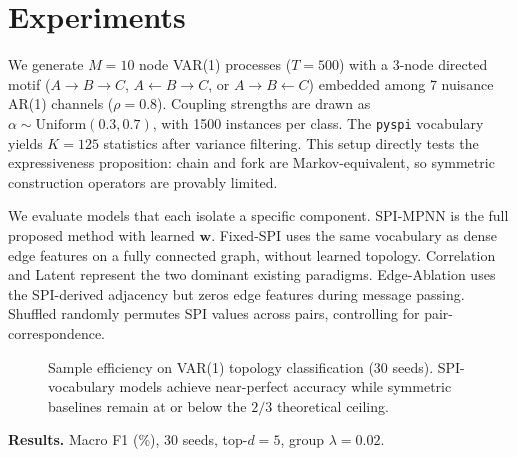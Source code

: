 \documentclass{article}
\theoremstyle{plain}
\begin{document}
\section{Experiments}
\label{sec:experiments}

We generate $M{=}10$ node VAR(1) processes ($T{=}500$) with a 3-node directed motif ($A{\to}B{\to}C$, $A{\leftarrow}B{\to}C$, or $A{\to}B{\leftarrow}C$) embedded among 7 nuisance AR(1) channels ($\rho{=}0.8$). Coupling strengths are drawn as $\alpha \sim \mathrm{Uniform}(0.3, 0.7)$, with 1500 instances per class. The \texttt{pyspi} vocabulary yields $K{=}125$ statistics after variance filtering. This setup directly tests the expressiveness proposition: chain and fork are Markov-equivalent, so symmetric construction operators are provably limited.

We evaluate models that each isolate a specific component. SPI-MPNN is the full proposed method with learned $\mathbf{w}$. Fixed-SPI uses the same vocabulary as dense edge features on a fully connected graph, without learned topology. Correlation and Latent represent the two dominant existing paradigms. Edge-Ablation uses the SPI-derived adjacency but zeros edge features during message passing. Shuffled randomly permutes SPI values across pairs, controlling for pair-correspondence.

\begin{figure}[t]
\vskip 0.2in
\begin{center}
\caption{Sample efficiency on VAR(1) topology classification (30 seeds). SPI-vocabulary models achieve near-perfect accuracy while symmetric baselines remain at or below the $2/3$ theoretical ceiling.}
\label{fig:sample_efficiency}
\end{center}
\vskip -0.2in
\end{figure}

\textbf{Results.} Macro F1 (\%), 30 seeds, top-$d{=}5$, group $\lambda{=}0.02$.
\end{document}
